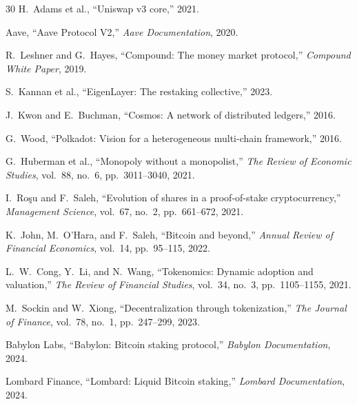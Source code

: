 \begin{thebibliography}{30}
H.~Adams et al., ``Uniswap v3 core,'' 2021.

Aave, ``Aave Protocol V2,'' \emph{Aave Documentation}, 2020.

R.~Leshner and G.~Hayes, ``Compound: The money market protocol,'' \emph{Compound White Paper}, 2019.

S.~Kannan et al., ``EigenLayer: The restaking collective,'' 2023.

J.~Kwon and E.~Buchman, ``Cosmos: A network of distributed ledgers,'' 2016.

G.~Wood, ``Polkadot: Vision for a heterogeneous multi-chain framework,'' 2016.

G.~Huberman et al., ``Monopoly without a monopolist,'' \emph{The Review of Economic Studies}, vol.~88, no.~6, pp.~3011--3040, 2021.

I.~Ro\c{s}u and F.~Saleh, ``Evolution of shares in a proof-of-stake cryptocurrency,'' \emph{Management Science}, vol.~67, no.~2, pp.~661--672, 2021.

K.~John, M.~O'Hara, and F.~Saleh, ``Bitcoin and beyond,'' \emph{Annual Review of Financial Economics}, vol.~14, pp.~95--115, 2022.

L.~W.~Cong, Y.~Li, and N.~Wang, ``Tokenomics: Dynamic adoption and valuation,'' \emph{The Review of Financial Studies}, vol.~34, no.~3, pp.~1105--1155, 2021.

M.~Sockin and W.~Xiong, ``Decentralization through tokenization,'' \emph{The Journal of Finance}, vol.~78, no.~1, pp.~247--299, 2023.

Babylon Labs, ``Babylon: Bitcoin staking protocol,'' \emph{Babylon Documentation}, 2024.

Lombard Finance, ``Lombard: Liquid Bitcoin staking,'' \emph{Lombard Documentation}, 2024.

\end{thebibliography}


